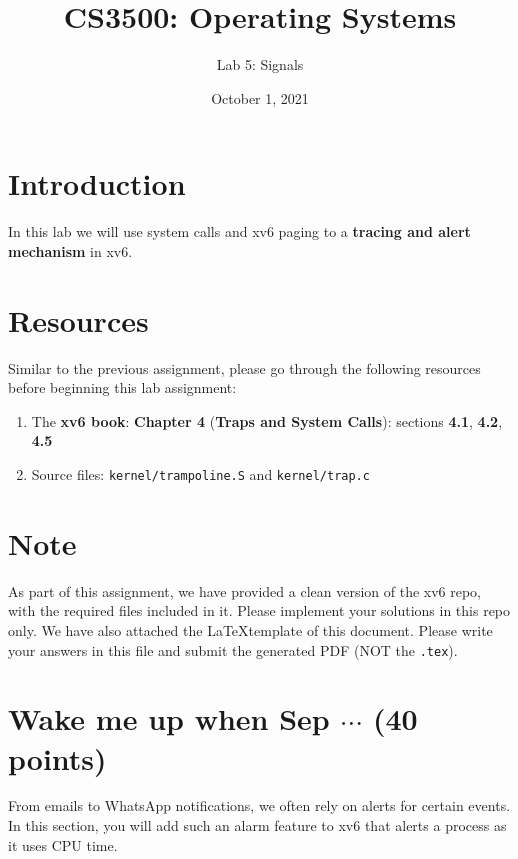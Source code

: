 \documentclass[11pt]{exam}
\title{\textbf{CS3500: Operating Systems}}
\subtitle{Lab 5: Signals\vspace{-1em}}
\date{October 1, 2021}
\begin{document}
\maketitle

\section*{Introduction} In this lab we will use system calls and xv6 paging  to a \textbf{tracing and alert mechanism} in xv6.

\section*{Resources} Similar to the previous assignment, please go through the following resources before beginning this lab assignment:
\begin{enumerate}
    \item The \textbf{xv6 book}: \textbf{Chapter 4} (\textbf{Traps and System Calls}): sections \textbf{4.1}, \textbf{4.2}, \textbf{4.5}
    \item Source files: \texttt{kernel/trampoline.S} and \texttt{kernel/trap.c}
\end{enumerate}

\section*{Note} As part of this assignment, we have provided a clean version of the xv6 repo, with the required files included in it. Please implement your solutions in this repo only. We have also attached the \LaTeX template of this document. Please write your answers in this file and submit the generated PDF (NOT the \texttt{.tex}). 


\section{Wake me up when Sep $\cdots$ (40 points)}

From emails to WhatsApp notifications, we often rely on alerts for certain events. In this section, you will add such an alarm feature to xv6 that alerts a process as it uses CPU time.
\end{document}
